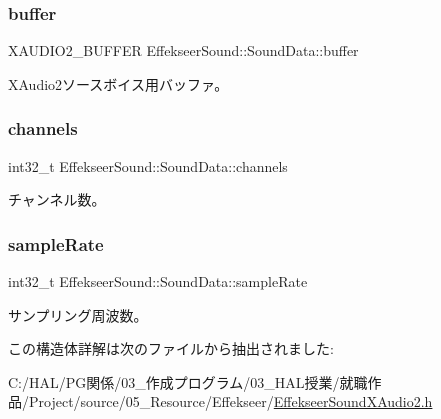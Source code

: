 \subsubsection{\texorpdfstring{buffer}{buffer}}
{\footnotesize\ttfamily X\+A\+U\+D\+I\+O2\+\_\+\+B\+U\+F\+F\+ER Effekseer\+Sound\+::\+Sound\+Data\+::buffer}



X\+Audio2ソースボイス用バッファ。 

\mbox{\label{struct_effekseer_sound_1_1_sound_data_a6ce06a2fb5016cc2664b525ace949423}} 
\subsubsection{\texorpdfstring{channels}{channels}}
{\footnotesize\ttfamily int32\+\_\+t Effekseer\+Sound\+::\+Sound\+Data\+::channels}



チャンネル数。 

\mbox{\label{struct_effekseer_sound_1_1_sound_data_a32d83df2626bbfbeafa1f6ebe72d9516}} 
\subsubsection{\texorpdfstring{sample\+Rate}{sampleRate}}
{\footnotesize\ttfamily int32\+\_\+t Effekseer\+Sound\+::\+Sound\+Data\+::sample\+Rate}



サンプリング周波数。 



この構造体詳解は次のファイルから抽出されました\+:\begin{DoxyCompactItemize}
\item 
C\+:/\+H\+A\+L/\+P\+G関係/03\+\_\+作成プログラム/03\+\_\+\+H\+A\+L授業/就職作品/\+Project/source/05\+\_\+\+Resource/\+Effekseer/\mbox{\hyperlink{_effekseer_sound_x_audio2_8h}{Effekseer\+Sound\+X\+Audio2.\+h}}\end{DoxyCompactItemize}
